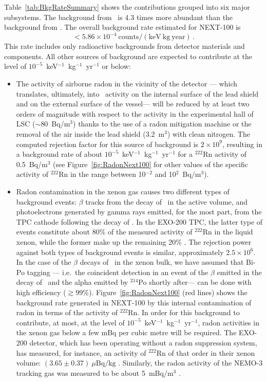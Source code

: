 Table~\ref{tab:BkgRateSummary} shows the contributions grouped into six major subsystems. The background from \Bi\ is 4.3 times more abundant than the background from \Tl. The overall background rate estimated for NEXT-100 is
\begin{equation}
<5.86\times10^{-4}~\mathrm{counts/(keV~kg~year)}\,.
\end{equation}
This rate includes only radioactive backgrounds from detector materials and components. All other sources of background are expected to contribute at the level of $10^{-5}$~keV$^{-1}$~kg$^{-1}$~yr$^{-1}$ or below:
\begin{itemize}
\item The activity of airborne radon in the vicinity of the detector --- which translates, ultimately, into \Bi\ activity on the internal surface of the lead shield and on the external surface of the vessel--- will be reduced  by at least two orders of magnitude with respect to the activity in the experimental hall of LSC ($\sim$80~Bq/m$^{3}$) thanks to the use of a radon mitigation machine or the removal of the air inside the lead shield (3.2~m$^{3}$) with clean nitrogen. The computed rejection factor for this source of background is $2\times10^{9}$, resulting in a background rate of about $10^{-5}$~keV$^{-1}$~kg$^{-1}$~yr$^{-1}$ for a $^{222}$Rn activity of 0.5~Bq/m$^{3}$ (see Figure~\ref{fig:RadonNext100} for other values of the specific activity of $^{222}$Rn in the range between 10$^{-2}$ and 10$^{2}$~Bq/m$^{3}$).
%
\item Radon contamination in the xenon gas causes two different types of background events: $\beta$ tracks from the decay of \Bi\ in the active volume, and photoelectrons generated by gamma rays emitted, for the most part, from the TPC cathode following the decay of \Bi. In the EXO-200 TPC, the latter type of events constitute about 80\% of the measured activity of $^{222}$Rn in the liquid xenon, while the former make up the remaining 20\% \cite{Albert:2013gpz}. The rejection power against both types of background events is similar, approximately $2.5\times10^{6}$. In the case of the $\beta$ decays of \Bi\ in the xenon bulk, we have assumed that Bi-Po tagging --- i.e.\ the coincident detection in an event of the $\beta$ emitted in the decay of \Bi\ and the alpha emitted by $^{214}$Po shortly after--- can be done with high efficiency ($\gtrsim99\%$). Figure~\ref{fig:RadonNext100} (red lines) shows the background rate generated in NEXT-100 by this internal contamination of radon in terms of the activity of $^{222}$Rn. In order for this background to contribute, at most, at the level of $10^{-5}$~keV$^{-1}$~kg$^{-1}$~yr$^{-1}$, radon activities in the xenon gas below a few mBq per cubic metre will be required. The EXO-200 detector, which has been operating without a radon suppression system, has measured, for instance, an activity of $^{222}$Rn of that order in their xenon volume: $(3.65\pm0.37)~\mu\mathrm{Bq/kg}$ \cite{Albert:2013gpz}. Similarly, the radon activity of the NEMO-3 tracking gas was measured to be about 5~mBq/m$^{3}$ \cite{Arnold:2013dha}.

\end{itemize}
